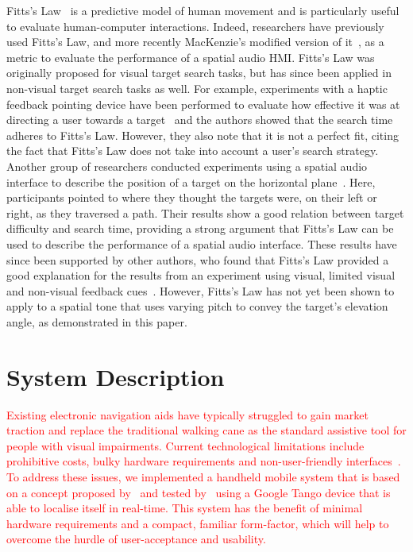 \documentclass[acmsmall]{acmart}
\newcommand\hl[1]{\textcolor{red}{#1}}
\begin{document}
Fitts's Law~\citep{fitts1954information} is a predictive model of human movement and is particularly useful to evaluate human-computer interactions.
Indeed, researchers have previously used Fitts's Law, and more recently MacKenzie's modified version of it~\citep{mackenzie1992fitts}, as a metric to evaluate the performance of a spatial audio HMI\@.
Fitts's Law was originally proposed for visual target search tasks, but has since been applied in non-visual target search tasks as well.
For example, experiments with a haptic feedback pointing device have been performed to evaluate how effective it was at directing a user towards a target~\citep{ahmaniemi2009augmented} and the authors showed that the search time adheres to Fitts's Law.
However, they also note that it is not a perfect fit, citing the fact that Fitts's Law does not take into account a user's search strategy.
Another group of researchers conducted experiments using a spatial audio interface to describe the position of a target on the horizontal plane~\citep{marentakis2006effects}.
Here, participants pointed to where they thought the targets were, on their left or right, as they traversed a path.
Their results show a good relation between target difficulty and search time, providing a strong argument that Fitts's Law can be used to describe the performance of a spatial audio interface.
These results have since been supported by other authors, who found that Fitts's Law provided a good explanation for the results from an experiment using visual, limited visual and non-visual feedback cues~\citep{wu2010fitts}.
However, Fitts's Law has not yet been shown to apply to a spatial tone that uses varying pitch to convey the target's elevation angle, as demonstrated in this paper.

\section{System Description}\label{sec:system-description}

\hl{Existing electronic navigation aids have typically struggled to gain market traction and replace the traditional walking cane as the standard assistive tool for people with visual impairments.
Current technological limitations include prohibitive costs, bulky hardware requirements and non-user-friendly interfaces~\citep{golledge2004stated,yusif2016older,arditi2013user}.
To address these issues, we implemented a handheld mobile system that is based on a concept proposed by~\citet{lock2019active} and tested by~\citet{lock2019bone} using a Google Tango device that is able to localise itself in real-time.
This system has the benefit of minimal hardware requirements and a compact, familiar form-factor, which will help to overcome the hurdle of user-acceptance and usability.}
\end{document}
